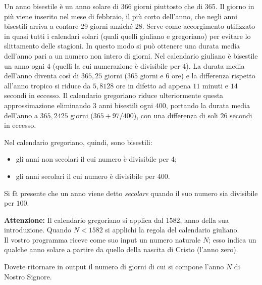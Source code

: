 \renewcommand{\nomebreve}{bisestile}
\renewcommand{\titolo}{Esercizio uso if: Riconscimento di anni bisestili}

\introduzione{}

Un anno bisestile è un anno solare di 366 giorni piuttosto che di 365.
Il giorno in più viene inserito nel mese di febbraio, il più corto dell'anno, che negli anni bisestili arriva a contare 29 giorni anziché 28.
Serve come accorgimento utilizzato in quasi tutti i calendari solari (quali quelli giuliano e gregoriano) per evitare lo slittamento delle stagioni.
In questo modo si può ottenere una durata media dell'anno pari a un numero non intero di giorni. 
Nel calendario giuliano è bisestile un anno ogni 4 (quelli la cui numerazione è divisibile per $4$). La durata media dell'anno diventa così di $365,25$ giorni ($365$ giorni e $6$ ore) e la differenza rispetto all'anno tropico si riduce da $5,8128$ ore in difetto ad appena $11$ minuti e $14$ secondi in eccesso. Il calendario gregoriano riduce ulteriormente questa approssimazione eliminando $3$ anni bisestili ogni $400$, portando la durata media dell'anno a $365,2425$ giorni ($365 + 97/400$), con una differenza di soli $26$ secondi in eccesso.

Nel calendario gregoriano, quindi, sono bisestili:
\begin{itemize}
   \item gli anni non secolari il cui numero è divisibile per 4;
   \item gli anni secolari il cui numero è divisibile per 400.
\end{itemize}

Si fà presente che un anno viene detto \emph{secolare} quando il suo numero sia divisibile per $100$.


{\bf Attenzione:} Il calendario gregoriano si applica dal 1582, anno della sua introduzione. Quando $N<1582$ si applichi la regola del calendario giuliano.\\ 

Il vostro programma riceve come suo input un numero naturale $N$; esso indica un qualche anno solare a partire da quello della nascita di Cristo (l'anno zero).


Dovete ritornare in output il numero di giorni di cui si compone l'anno $N$ di Nostro Signore.



